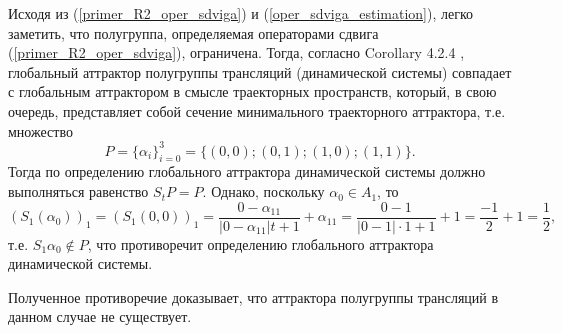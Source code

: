 Исходя из (\ref{primer_R2_oper_sdviga}) и (\ref{oper_sdviga_estimation}), легко заметить, что полугруппа, определяемая операторами сдвига (\ref{primer_R2_oper_sdviga}), ограничена.
Тогда, согласно Corollary 4.2.4 \cite{Zvyagin}, глобальный аттрактор полугруппы трансляций (динамической системы) совпадает с глобальным аттрактором в смысле траекторных пространств, который, в свою очередь, представляет собой сечение минимального траекторного аттрактора, т.е. множество
$$
	P = \{\alpha_i\}_{i=0}^3 = \{(0,0); (0,1); (1,0); (1,1)\}.
$$
Тогда по определению глобального аттрактора динамической системы должно выполняться равенство $S_t P = P$.
Однако, поскольку $\alpha_0 \in A_1$, то
$$
	(S_1(\alpha_0))_1 = (S_1(0,0))_1 =
	\frac{0-\alpha_{11}}{|0-\alpha_{11}|t+1}+\alpha_{11} =
	\frac{0-1}{|0-1|\cdot 1 +1}+1 = \frac{-1}{2} + 1 = \frac{1}{2}, 
$$
т.е. $S_1 \alpha_0 \notin P$, что противоречит определению глобального аттрактора динамической системы.

Полученное противоречие доказывает, что аттрактора полугруппы трансляций в данном случае не существует.


